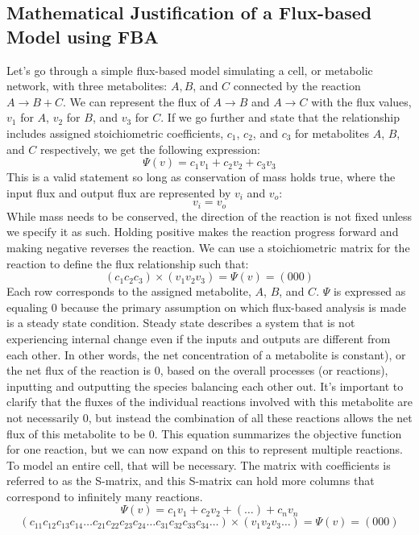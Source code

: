 \subsection{Mathematical Justification of a Flux-based Model using FBA}
Let’s go through a simple flux-based model simulating a cell, or metabolic network, with three metabolites: $A, B$, and $C$ connected by the reaction $A\rightarrow B+C$. 
We can represent the flux of $A\rightarrow B$ and $A\rightarrow C$ with the flux values, $v_1$ for $A$, $v_2$ for $B$, and $v_3$ for $C$. If we go further and state that the relationship includes assigned stoichiometric coefficients, $c_1$, $c_2$, and $c_3$ for metabolites $A$, $B$, and $C$ respectively, we get the following expression:
$$\Psi(v) = c_1v_1 + c_2v_2 + c_3v_3$$
This is a valid statement so long as conservation of mass holds true, where the input flux and output flux are represented by $v_i$ and $v_o$:
$$v_i=v_o$$
While mass needs to be conserved, the direction of the reaction is not fixed unless we specify it as such. Holding  positive makes the reaction progress forward and making  negative reverses the reaction. We can use a stoichiometric matrix for the reaction to define the flux relationship such that:
$$\left(c_1 c_2  c_3\right)  \times \left(v_1 v_2  v_3\right) = \Psi(v)= (0 0 0) $$
Each row corresponds to the assigned metabolite, $A$, $B$, and $C$. $\Psi$ is expressed as equaling $0$ because the primary assumption on which flux-based analysis is made is a steady state condition. Steady state describes a system that is not experiencing internal change even if the inputs and outputs are different from each other. In other words, the net concentration of a metabolite is constant), or the net flux of the reaction is $0$, based on the overall processes (or reactions), inputting and outputting the species balancing each other out. It’s important to clarify that the fluxes of the individual reactions involved with this metabolite are not necessarily $0$, but instead the combination of all these reactions allows the net flux of this metabolite to be 0. This equation summarizes the objective function for one reaction, but we can now expand on this to represent multiple reactions. To model an entire cell, that will be necessary.  The matrix with coefficients is referred to as the S-matrix, and this S-matrix can hold more columns that correspond to infinitely many reactions. 
$$\Psi(v)=c_1v_1 + c_2v_2+(\ldots)+c_nv_n$$
$$
\left(c_{11} c_{12} c_{13} c_{14} \ldots c_{21} c_{22} c_{23} c_{24} \ldots c_{31} c_{32} c_{33} c_{34} \ldots\right) \times \left( v_1 v_2 v_3 \ldots\right)  = \Psi(v)=\left(0 0 0 \right)  $$
